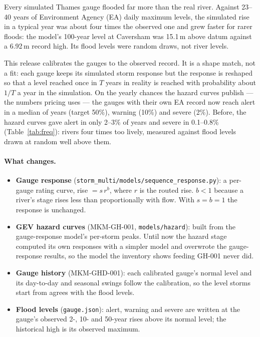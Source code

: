 \documentclass[11pt,a4paper]{article}
\begin{document}
\sloppy
\mkmtitlepage
\mkmlegalpage
\tableofcontents
\clearpage

\mkmexecsummary

Every simulated Thames gauge flooded far more than the real river. Against 23--40 years of
Environment Agency (EA) daily maximum levels, the simulated rise in a typical year was about
four times the observed one and grew faster for rarer floods: the model's 100-year level at
Caversham was 15.1\,m above datum against a 6.92\,m record high. Its flood levels were
random draws, not river levels.

This release calibrates the gauges to the observed record. It is a shape match, not a fit:
each gauge keeps its simulated storm response but the response is reshaped so that a level
reached once in $T$ years in reality is reached with probability about $1/T$ a year in the
simulation. On the yearly chances the hazard curves publish --- the numbers pricing uses ---
the \gcNCal{} gauges with their own EA record now reach alert in a median \gcMedAlert{} of
years (target 50\%), warning \gcMedWarning{} (10\%) and severe \gcMedSevere{} (2\%). Before,
the hazard curves gave alert in only 2--3\% of years and severe in 0.1--0.8\%
(Table~\ref{tab:freq}): rivers four times too lively, measured against flood levels drawn at
random well above them.

\paragraph{What changes.}
\begin{itemize}[nosep]
    \item \textbf{Gauge response} (\texttt{storm\_multi/models/sequence\_response.py}): a
          per-gauge rating curve, rise $= s\,r^{b}$, where $r$ is the routed rise. $b<1$
          because a river's stage rises less than proportionally with flow. With $s=b=1$
          the response is unchanged.
    \item \textbf{GEV hazard curves} (MKM-GH-001, \texttt{models/hazard}): built from the
          gauge-response model's per-storm peaks. Until now the hazard stage computed its
          own responses with a simpler model and overwrote the gauge-response results, so
          the model the inventory shows feeding GH-001 never did.
    \item \textbf{Gauge history} (MKM-GHD-001): each calibrated gauge's normal level and its
          day-to-day and seasonal swings follow the calibration, so the level storms start
          from agrees with the flood levels.
    \item \textbf{Flood levels} (\texttt{gauge.json}): alert, warning and severe are written
          at the gauge's observed 2-, 10- and 50-year rises above its normal level; the
          historical high is its observed maximum.
\end{itemize}
\end{document}
